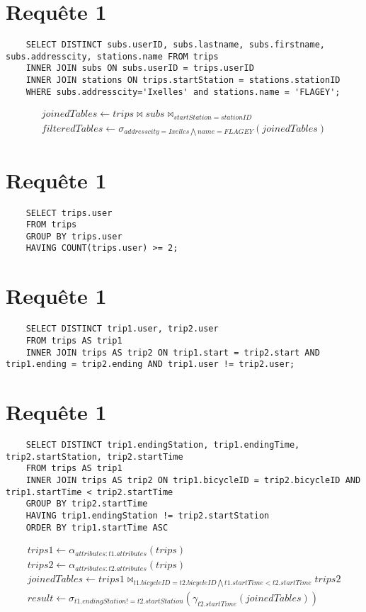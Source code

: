 \documentclass[a4paper,11pt]{article}
\begin{document}
\section{Requ\^ete 1}
    \begin{lstlisting}
    SELECT DISTINCT subs.userID, subs.lastname, subs.firstname, subs.addresscity, stations.name FROM trips 
    INNER JOIN subs ON subs.userID = trips.userID
    INNER JOIN stations ON trips.startStation = stations.stationID
    WHERE subs.addresscity='Ixelles' and stations.name = 'FLAGEY';
    \end{lstlisting}

    \begin{align}
    joinedTables \leftarrow trips \bowtie subs \bowtie_{startStation = stationID} \\
    filteredTables \leftarrow \sigma_{addresscity=Ixelles \bigwedge name=FLAGEY}(joinedTables)
    \end{align}

\section{Requ\^ete 1}
    \begin{lstlisting}
    SELECT trips.user
    FROM trips
    GROUP BY trips.user
    HAVING COUNT(trips.user) >= 2;
    \end{lstlisting}


\section{Requ\^ete 1}
    \begin{lstlisting}
    SELECT DISTINCT trip1.user, trip2.user
    FROM trips AS trip1
    INNER JOIN trips AS trip2 ON trip1.start = trip2.start AND trip1.ending = trip2.ending AND trip1.user != trip2.user;
    \end{lstlisting}


\section{Requ\^ete 1}
    \begin{lstlisting}
    SELECT DISTINCT trip1.endingStation, trip1.endingTime, trip2.startStation, trip2.startTime
    FROM trips AS trip1
    INNER JOIN trips AS trip2 ON trip1.bicycleID = trip2.bicycleID AND trip1.startTime < trip2.startTime
    GROUP BY trip2.startTime
    HAVING trip1.endingStation != trip2.startStation
    ORDER BY trip1.startTime ASC
    \end{lstlisting}
    \begin{gather}
    trips1 \leftarrow \alpha_{attributes:t1.attributes}(trips)\\
    trips2 \leftarrow \alpha_{attributes:t2.attributes}(trips)\\
    joinedTables \leftarrow trips1 \bowtie_{t1.bicycleID = t2.bicycleID \bigwedge t1.startTime < t2.startTime} trips2 \\
    result \leftarrow \sigma_{t1.endingStation != t2.startStation} (\gamma_{t2.startTime}(joinedTables))
    \end{gather}
\end{document}
